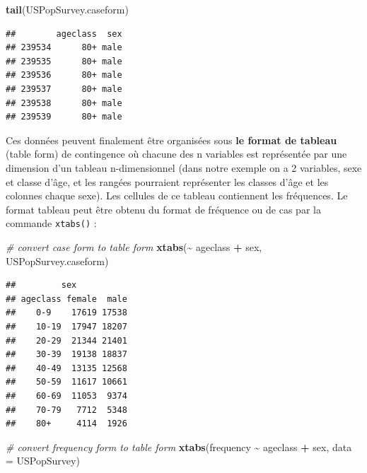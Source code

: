 \documentclass[
  12pt,
]{book}
\newenvironment{Shaded}{\begin{snugshade}}{\end{snugshade}}
\newcommand{\CommentTok}[1]{\textcolor[rgb]{0.56,0.35,0.01}{\textit{#1}}}
\newcommand{\DataTypeTok}[1]{\textcolor[rgb]{0.13,0.29,0.53}{#1}}
\newcommand{\KeywordTok}[1]{\textcolor[rgb]{0.13,0.29,0.53}{\textbf{#1}}}
\newcommand{\NormalTok}[1]{#1}
\newcommand{\OperatorTok}[1]{\textcolor[rgb]{0.81,0.36,0.00}{\textbf{#1}}}
\newcommand{\StringTok}[1]{\textcolor[rgb]{0.31,0.60,0.02}{#1}}
\begin{document}
\begin{Shaded}
\begin{Highlighting}[]
\KeywordTok{tail}\NormalTok{(USPopSurvey.caseform)}
\end{Highlighting}
\end{Shaded}

\begin{verbatim}
##        ageclass  sex
## 239534      80+ male
## 239535      80+ male
## 239536      80+ male
## 239537      80+ male
## 239538      80+ male
## 239539      80+ male
\end{verbatim}

Ces données peuvent finalement être organisées sous \textbf{le format de tableau} (table form) de contingence où chacune des n variables est représentée par une dimension d'un tableau n-dimensionnel (dans notre exemple on a 2 variables, sexe et classe d'âge, et les rangées pourraient représenter les classes d'âge et les colonnes chaque sexe). Les cellules de ce tableau contiennent les fréquences. Le format tableau peut être obtenu du format de fréquence ou de cas par la commande \texttt{xtabs()} :

\begin{Shaded}
\begin{Highlighting}[]
\CommentTok{\# convert case form to table form}
\KeywordTok{xtabs}\NormalTok{(}\OperatorTok{\textasciitilde{}}\StringTok{ }\NormalTok{ageclass }\OperatorTok{+}\StringTok{ }\NormalTok{sex, USPopSurvey.caseform)}
\end{Highlighting}
\end{Shaded}

\begin{verbatim}
##         sex
## ageclass female  male
##    0-9    17619 17538
##    10-19  17947 18207
##    20-29  21344 21401
##    30-39  19138 18837
##    40-49  13135 12568
##    50-59  11617 10661
##    60-69  11053  9374
##    70-79   7712  5348
##    80+     4114  1926
\end{verbatim}

\begin{Shaded}
\begin{Highlighting}[]
\CommentTok{\# convert frequency form to table form}
\KeywordTok{xtabs}\NormalTok{(frequency }\OperatorTok{\textasciitilde{}}\StringTok{ }\NormalTok{ageclass }\OperatorTok{+}\StringTok{ }\NormalTok{sex, }\DataTypeTok{data =}\NormalTok{ USPopSurvey)}
\end{Highlighting}
\end{Shaded}
\end{document}
